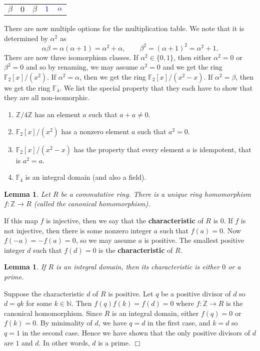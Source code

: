 \documentclass{article}
\def\Z{{\mathbb Z}}
\def\F{{\mathbb F}}
\def\N{{\mathbb N}}
\def\Z{{\mathbb Z}}
\def\F{{\mathbb F}}
\newtheorem{lemma}[subsection]{Lemma}
\newenvironment{proof}{\noindent {\bf Proof:}}{$\Box$ \vspace{2 ex}}
\newcommand{\add}[1]{{\color{blue} #1}}
\begin{document}
\begin{enumerate}
\begin{center}
\begin{tabular}{c|c|c|c|c}
             $\beta$&$0$&$\beta$&$\add{1}$&$\add{\alpha}$
    \end{tabular}
    \end{center}
    There are now multiple options for the multiplication table. We note that it is determined by $\alpha^2$ as $$\alpha\beta = \alpha(\alpha+1) = \alpha^2 + \alpha,\qquad\beta^2 = (\alpha+1)^2 = \alpha^2 + 1.$$ There are now three isomorphism classes. If $\alpha^2\in\{0,1\}$, then either $\alpha^2 = 0$ or $\beta^2 = 0$ and so by renaming, we may assume $\alpha^2 = 0$ and we get the ring $\F_2[x]/(x^2)$. If $\alpha^2 = \alpha$, then we get the ring $\F_2[x]/(x^2 - x).$ If $\alpha^2 = \beta$, then we get the ring $\F_4$. We list the special property that they each have to show that they are all non-isomorphic.
    \begin{enumerate}
        \item $\Z/4\Z$ has an element $a$ such that $a + a\neq 0$.
        \item $\F_2[x]/(x^2)$ has a nonzero element $a$ such that $a^2 = 0$.
        \item $\F_2[x]/(x^2 - x)$ has the property that every element $a$ is idempotent, that is $a^2 = a$.
        \item $\F_4$ is an integral domain (and also a field).
    \end{enumerate}

    \begin{lemma}\label{lem:can}
        Let $R$ be a commutative ring. There is a unique ring homomorphism $f:\Z\rightarrow R$ (called the canonical homomorphism).
    \end{lemma}

    If this map $f$ is injective, then we say that the \textbf{characteristic} of $R$ is $0$. If $f$ is not injective, then there is some nonzero integer $a$ such that $f(a) = 0$. Now $f(-a) = -f(a) = 0$, so we may assume $a$ is positive. The smallest positive integer $d$ such that $f(d) = 0$ is the \textbf{characteristic} of $R$.

    \begin{lemma}
        If $R$ is an integral domain, then its characteristic is either $0$ or a prime.
    \end{lemma}

    \begin{proof}
        Suppose the characteristic $d$ of $R$ is positive. Let $q$ be a positive divisor of $d$ so $d = qk$ for some $k\in\N$. Then $f(q)f(k) = f(d) = 0$ where $f:\Z\rightarrow R$ is the canonical homomorphism. Since $R$ is an integral domain, either $f(q) = 0$ or $f(k) = 0$. By minimality of $d$, we have $q = d$ in the first case, and $k = d$ so $q = 1$ in the second case. Hence we have shown that the only positive divisors of $d$ are $1$ and $d$. In other words, $d$ is a prime.
    \end{proof}


\end{enumerate}
\end{document}
